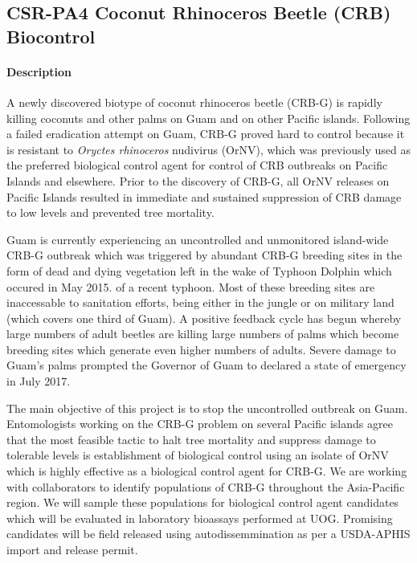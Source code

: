 \subsection{CSR-PA4 Coconut Rhinoceros Beetle (CRB) Biocontrol}\label{sec:coconut-rhinoceros-beetle-(crb)-biocontrol}
\begin{refsection}
	
\paragraph{Description}

A newly discovered biotype of coconut rhinoceros beetle (CRB-G) is
rapidly killing coconuts and other palms on Guam and on other Pacific
islands. Following a failed eradication attempt on Guam, CRB-G proved
hard to control because it is resistant to \emph{Oryctes rhinoceros}
nudivirus (OrNV), which was previously used as the preferred biological
control agent for control of CRB outbreaks on Pacific Islands and
elsewhere. Prior to the discovery of CRB-G, all OrNV releases on
Pacific Islands resulted in immediate and sustained suppression of
CRB damage to low levels and prevented tree mortality.

Guam is currently experiencing an uncontrolled and unmonitored island-wide
CRB-G outbreak which was triggered by abundant CRB-G breeding sites
in the form of dead and dying vegetation left in the wake of Typhoon
Dolphin which occured in May 2015. of a recent typhoon. Most of these
breeding sites are inaccessable to sanitation efforts, being either
in the jungle or on military land (which covers one third of Guam).
A positive feedback cycle has begun whereby large numbers of adult
beetles are killing large numbers of palms which become breeding sites
which generate even higher numbers of adults. Severe damage to Guam\textquoteright s
palms prompted the Governor of Guam to declared a state of emergency
in July 2017.

The main objective of this project is to stop the uncontrolled outbreak
on Guam. Entomologists working on the CRB-G problem on several Pacific
islands agree that the most feasible tactic to halt tree mortality
and suppress damage to tolerable levels is establishment of biological
control using an isolate of OrNV which is highly effective as a biological
control agent for CRB-G. We are working with collaborators to identify
populations of CRB-G throughout the Asia-Pacific region. We will sample
these populations for biological control agent candidates which will
be evaluated in laboratory bioassays performed at UOG. Promising candidates
will be field released using autodissemmination as per a USDA-APHIS
import and release permit.


\end{refsection}
